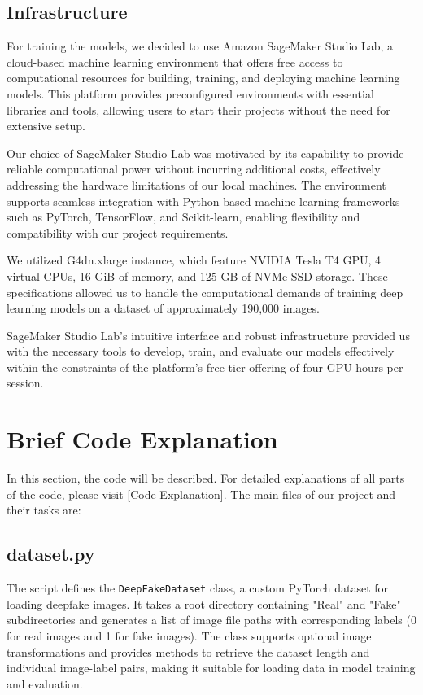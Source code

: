 \documentclass[conference]{IEEEtran}
\begin{document}
\subsection*{Infrastructure}
For training the models, we decided to use Amazon SageMaker Studio Lab, a cloud-based machine learning environment that offers free access to computational resources for building, training, and deploying machine learning models. This platform provides preconfigured environments with essential libraries and tools, allowing users to start their projects without the need for extensive setup.

Our choice of SageMaker Studio Lab was motivated by its capability to provide reliable computational power without incurring additional costs, effectively addressing the hardware limitations of our local machines. The environment supports seamless integration with Python-based machine learning frameworks such as PyTorch, TensorFlow, and Scikit-learn, enabling flexibility and compatibility with our project requirements.

We utilized G4dn.xlarge instance, which feature NVIDIA Tesla T4 GPU, 4 virtual CPUs, 16 GiB of memory, and 125 GB of NVMe SSD storage. These specifications allowed us to handle the computational demands of training deep learning models on a dataset of approximately 190,000 images.

SageMaker Studio Lab's intuitive interface and robust infrastructure provided us with the necessary tools to develop, train, and evaluate our models effectively within the constraints of the platform's free-tier offering of four GPU hours per session.

\section{Brief Code Explanation}

In this section, the code will be described. For detailed explanations of all parts of the code, please visit \href{https://github.com/konradwojda/HYU-AI-G08/blob/main/docs/code_explanation.md}{[Code Explanation]}. The main files of our project and their tasks are:


    \subsection*{dataset.py}
    The script defines the \texttt{DeepFakeDataset} class, a custom PyTorch dataset for loading deepfake images. It takes a root directory containing "Real" and "Fake" subdirectories and generates a list of image file paths with corresponding labels (0 for real images and 1 for fake images). The class supports optional image transformations and provides methods to retrieve the dataset length and individual image-label pairs, making it suitable for loading data in model training and evaluation.
\end{document}
